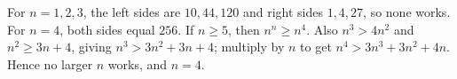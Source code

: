 For $n=1,2,3$, the left sides are $10,44,120$ and right sides $1,4,27$, so none works. For $n=4$, both sides equal $256$. If $n\ge5$, then $n^n\ge n^4$. Also $n^3>4n^2$ and $n^2\ge3n+4$, giving $n^3>3n^2+3n+4$; multiply by $n$ to get $n^4>3n^3+3n^2+4n$. Hence no larger $n$ works, and $\boxed{n=4}$.
